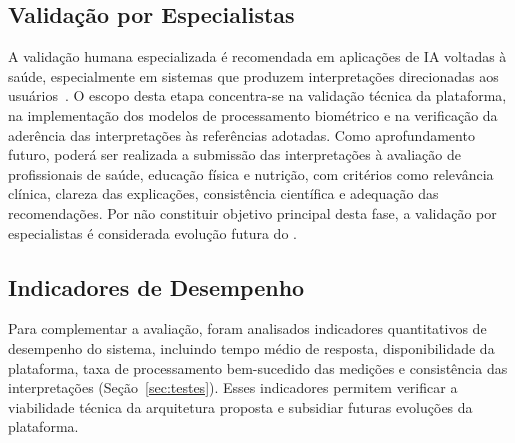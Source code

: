 \subsection{Validação por Especialistas}

A validação humana especializada é recomendada em aplicações de IA voltadas à saúde,
especialmente em sistemas que produzem interpretações direcionadas aos
usuários~\cite{etic2024}. O escopo desta etapa concentra-se na validação técnica da
plataforma, na implementação dos modelos de processamento biométrico e na verificação da
aderência das interpretações às referências adotadas. Como aprofundamento futuro, poderá
ser realizada a submissão das interpretações à avaliação de profissionais de saúde,
educação física e nutrição, com critérios como relevância clínica, clareza das explicações,
consistência científica e adequação das recomendações. Por não constituir objetivo
principal desta fase, a validação por especialistas é considerada evolução futura do
\sintonia.

\subsection{Indicadores de Desempenho}

Para complementar a avaliação, foram analisados indicadores quantitativos de desempenho do
sistema, incluindo tempo médio de resposta, disponibilidade da plataforma, taxa de
processamento bem-sucedido das medições e consistência das interpretações
(Seção~\ref{sec:testes}). Esses indicadores permitem verificar a viabilidade técnica da
arquitetura proposta e subsidiar futuras evoluções da plataforma.
